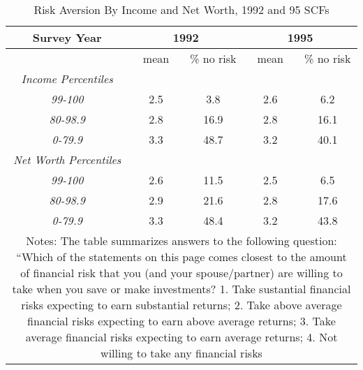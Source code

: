 
\begin{table}
\caption{Risk Aversion By Income and Net Worth, 1992 and 95 SCFs}
\begin{center}
\begin{tabular}{|c|c|c|c|c|}
\hline
\multicolumn{1}{|c|}{\textbf{Survey Year}} & \multicolumn{2}{|c|}{\textbf{%
1992}} & \multicolumn{2}{|c|}{\textbf{1995}} \\ \hline
\multicolumn{1}{|c|}{} & mean & \% no risk & mean & \% no risk \\ \hline
\multicolumn{1}{|c|}{\textit{Income Percentiles}} &  &  &  &  \\ 
\multicolumn{1}{|c|}{\textit{99-100}} & 2.5 & 3.8 & 2.6 & 6.2 \\ 
\multicolumn{1}{|c|}{\textit{80-98.9}} & 2.8 & 16.9 & 2.8 & 16.1 \\ 
\textit{0-79.9} & 3.3 & 48.7 & 3.2 & 40.1 \\ \hline
\multicolumn{1}{|c|}{\textit{Net Worth Percentiles}} &  &  &  &  \\ 
\multicolumn{1}{|c|}{\textit{99-100}} & 2.6 & 11.5 & 2.5 & 6.5 \\ 
\multicolumn{1}{|c|}{\textit{80-98.9}} & 2.9 & 21.6 & 2.8 & 17.6 \\ 
\multicolumn{1}{|c|}{\textit{0-79.9}} & 3.3 & 48.4 & 3.2 & 43.8 \\ \hline
\multicolumn{5}{p{.75\linewidth}}{\tiny Notes: The table summarizes answers to the following question: ``Which of the statements on this page comes closest to the amount
of financial risk that you (and your spouse/partner) are willing to take
when you save or make investments?  
1. Take sustantial financial risks expecting to earn substantial returns;
2. Take above average financial risks expecting to earn above average returns;
3. Take average financial risks expecting to earn average returns;
4. Not willing to take any financial risks} \\
\end{tabular}
\label{table:riskaver}
\end{center}
\end{table}

